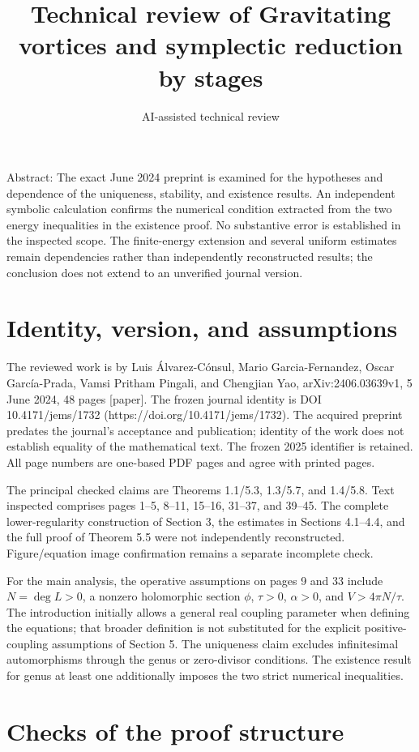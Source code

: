 \documentclass[10pt]{article}
\title{Technical review of Gravitating vortices and symplectic reduction by stages}
\author{AI-assisted technical review}
\date{}
\begin{document}
\maketitle
Abstract: The exact June 2024 preprint is examined for the hypotheses and dependence of the uniqueness, stability, and existence results. An independent symbolic calculation confirms the numerical condition extracted from the two energy inequalities in the existence proof. No substantive error is established in the inspected scope. The finite-energy extension and several uniform estimates remain dependencies rather than independently reconstructed results; the conclusion does not extend to an unverified journal version.\par
\section*{Identity, version, and assumptions}
The reviewed work is by Luis Álvarez-Cónsul, Mario Garcia-Fernandez, Oscar García-Prada, Vamsi Pritham Pingali, and Chengjian Yao, arXiv:2406.03639v1, 5 June 2024, 48 pages [paper]. The frozen journal identity is DOI 10.4171/jems/1732 (https://doi.org/10.4171/jems/1732). The acquired preprint predates the journal’s acceptance and publication; identity of the work does not establish equality of the mathematical text. The frozen 2025 identifier is retained. All page numbers are one-based PDF pages and agree with printed pages.\par
The principal checked claims are Theorems 1.1/5.3, 1.3/5.7, and 1.4/5.8. Text inspected comprises pages 1–5, 8–11, 15–16, 31–37, and 39–45. The complete lower-regularity construction of Section 3, the estimates in Sections 4.1–4.4, and the full proof of Theorem 5.5 were not independently reconstructed. Figure/equation image confirmation remains a separate incomplete check.\par
For the main analysis, the operative assumptions on pages 9 and 33 include \(N=\deg L>0\), a nonzero holomorphic section \(\phi\), \(\tau>0\), \(\alpha>0\), and \(V>4\pi N/\tau\). The introduction initially allows a general real coupling parameter when defining the equations; that broader definition is not substituted for the explicit positive-coupling assumptions of Section 5. The uniqueness claim excludes infinitesimal automorphisms through the genus or zero-divisor conditions. The existence result for genus at least one additionally imposes the two strict numerical inequalities.\par
\section*{Checks of the proof structure}
\end{document}
